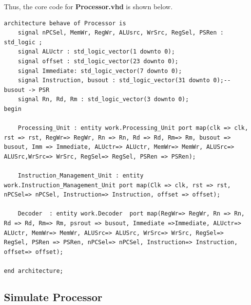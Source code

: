 Thus, the core code for \textbf{Processor.vhd} is shown below.
\vspace*{1mm}
\begin{lstlisting}[style=vhdl,breaklines]
architecture behave of Processor is
    signal nPCSel, MemWr, RegWr, ALUsrc, WrSrc, RegSel, PSRen : std_logic ;
    signal ALUctr : std_logic_vector(1 downto 0);
    signal offset : std_logic_vector(23 downto 0);
    signal Immediate: std_logic_vector(7 downto 0);
    signal Instruction, busout : std_logic_vector(31 downto 0);--busout -> PSR
    signal Rn, Rd, Rm : std_logic_vector(3 downto 0); 
begin

    Processing_Unit : entity work.Processing_Unit port map(clk => clk, rst => rst, RegWr=> RegWr, Rn => Rn, Rd => Rd, Rm=> Rm, busout => busout, Imm => Immediate, ALUctr=> ALUctr, MemWr=> MemWr, ALUSrc=> ALUSrc,WrSrc=> WrSrc, RegSel=> RegSel, PSRen => PSRen); 

    Instruction_Management_Unit : entity work.Instruction_Management_Unit port map(Clk => clk, rst => rst, nPCSel=> nPCSel, Instruction=> Instruction, offset => offset); 

    Decoder  : entity work.Decoder  port map(RegWr=> RegWr, Rn => Rn, Rd => Rd, Rm=> Rm, psrout => busout, Immediate =>Immediate, ALUctr=> ALUctr, MemWr=> MemWr, ALUSrc=> ALUSrc, WrSrc=> WrSrc, RegSel=> RegSel, PSRen => PSRen, nPCSel=> nPCSel, Instruction=> Instruction, offset=> offset); 

end architecture;
\end{lstlisting}



\subsection{Simulate Processor}
\label{sec:Simulate Processor}

